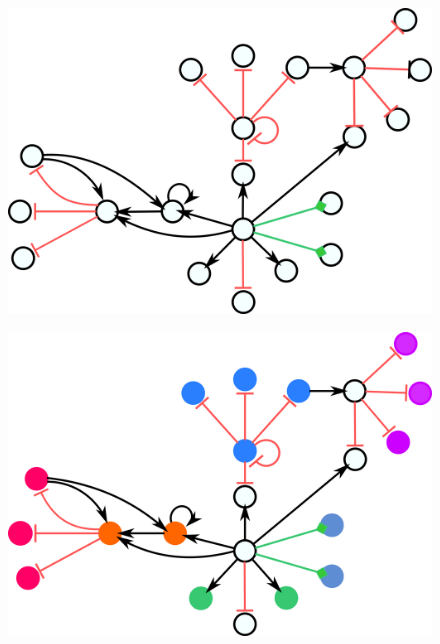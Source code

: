 \documentclass[12pt]{diazessay} %
\begin{document}
\begin{figure}[h]
	\centering
	\includegraphics[scale=0.3]{Figures/result2.png}
\end{figure}
\begin{figure}[h]
	\centering
	\includegraphics[scale=0.3]{Figures/result2-1.png}
\end{figure}
\end{document}
